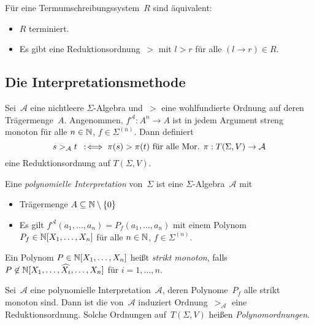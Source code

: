 \documentclass{cheat-sheet}
\renewcommand{\Alg}{\mathcal{A}} %
\begin{document}
\begin{thm}
  Für eine Termumschreibungssystem~$R$ sind äquivalent:
  \begin{itemize}
    \item $R$ terminiert.
    \item Es gibt eine Reduktionsordnung~$>$ mit $l > r$ für alle $(l \to r) \in R$.
  \end{itemize}
\end{thm}

\subsection{Die Interpretationsmethode}

\begin{lemdefn}
  Sei~$\Alg$ eine nichtleere $\Sigma$-Algebra und~$>$ eine wohlfundierte Ordnung auf deren Trägermenge~$A$.
  Angenommen, $f^\Alg : A^n \to A$ ist in jedem Argument streng monoton für alle $n \in \mathbb{N}$, $f \in \Sigma^{(n)}$.
  Dann definiert
  \[
    s >_\Alg t \coloniff \pi(s) > \pi(t) \text{ für alle Mor. $\pi : T(\Sigma, V) \to \Alg$}
  \]
  eine Reduktionsordnung auf $T(\Sigma, V)$.
\end{lemdefn}


\begin{defn}
  Eine \emph{polynomielle Interpretation} von~$\Sigma$ ist eine $\Sigma$-Algebra~$\Alg$ mit
  \begin{itemize}
    \item Trägermenge $A \subseteq \mathbb{N} \setminus \{ 0 \}$
    \item Es gilt $f^\Alg(a_1, \ldots, a_n) = P_f(a_1, \ldots, a_n)$ mit einem Polynom $P_f \in \mathbb{N}[X_1, \ldots, X_n]$ für alle $n \in \mathbb{N}$, $f \in \Sigma^{(n)}$.
  \end{itemize}
\end{defn}

\begin{defn}
  Ein Polynom $P \in \mathbb{N}[X_1, \ldots, X_n]$ heißt \emph{strikt monoton}, falls $P \not\in \mathbb{N}[X_1, \ldots, \widehat{X_i}, \ldots, X_n]$ für $i = 1, \ldots, n$.
\end{defn}

\begin{lemdefn}
  Sei~$\Alg$ eine polynomielle Interpretation~$\Alg$, deren Polynome~$P_f$ alle strikt monoton sind.
  Dann ist die von~$\Alg$ induziert Ordnung~$>_\Alg$ eine Reduktionsordnung.
  Solche Ordnungen auf~$T(\Sigma, V)$ heißen \emph{Polynomordnungen}.
\end{lemdefn}
\end{document}
